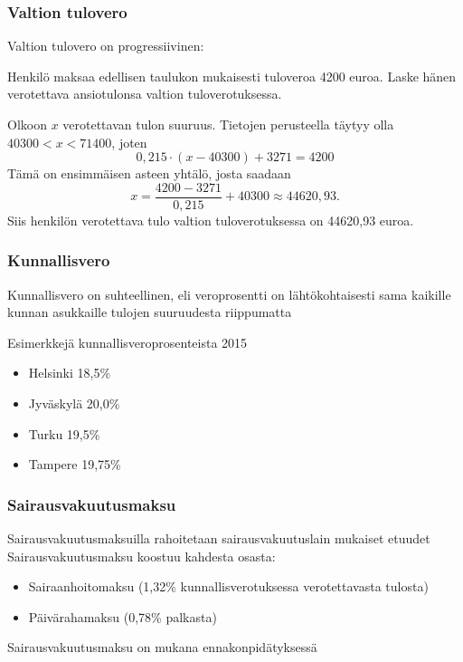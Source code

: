 \documentclass{beamer}
\newcommand{\pblock}{\\ \vspace{0.5cm}\pause}
\begin{document}
\begin{frame}
\frametitle{Valtion tulovero}
\pause
Valtion tulovero on progressiivinen:
	\begin{small}
	    
	\end{small}
\end{frame}


\begin{frame}
	\begin{esim}
		Henkilö maksaa edellisen taulukon mukaisesti tuloveroa 4200 euroa. Laske hänen verotettava ansiotulonsa valtion tuloverotuksessa.
	\end{esim}
	\begin{ratkaisu}
		\pause Olkoon \(x\) verotettavan tulon suuruus. \pause Tietojen perusteella täytyy olla \(40300 < x < 71400\), \pause joten 
		\[
			0,215\cdot(x-40300) + 3271 = 4200
		\]\pause
		Tämä on ensimmäisen asteen yhtälö, josta saadaan \pause
		\[
			x = \frac{4200-3271}{0,215}+40300 \approx 44620,93.
		\] \pause
		Siis henkilön verotettava tulo valtion tuloverotuksessa on 44620,93 euroa.
	\end{ratkaisu}
\end{frame}
\begin{frame}
\frametitle{Kunnallisvero}
\pause
Kunnallisvero on suhteellinen, eli veroprosentti on lähtökohtaisesti sama kaikille kunnan asukkaille tulojen suuruudesta riippumatta
	\begin{block}{Esimerkkejä kunnallisveroprosenteista 2015}
		\begin{itemize}
			\item Helsinki 18,5\% 
			\item Jyväskylä 20,0\%
			\item Turku 19,5\%
			\item Tampere 19,75\%
		\end{itemize}
	\end{block}
\end{frame}

\begin{frame}
\frametitle{Sairausvakuutusmaksu}
\pause
Sairausvakuutusmaksuilla rahoitetaan sairausvakuutuslain mukaiset etuudet 
\pblock
Sairausvakuutusmaksu koostuu kahdesta osasta:
\begin{itemize}
	\item Sairaanhoitomaksu (1,32\%	kunnallisverotuksessa verotettavasta tulosta)
	\item Päivärahamaksu (0,78\% palkasta)
	\pblock
\end{itemize}
Sairausvakuutusmaksu on mukana ennakonpidätyksessä
\end{frame}
\end{document}
